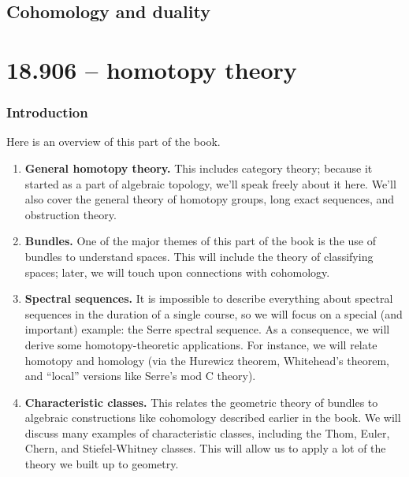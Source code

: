 \documentclass[11pt]{memoir}
\begin{document}
\chapter{Cohomology and duality}














\part{18.906 -- homotopy theory}\label{906}

\section*{Introduction}
Here is an overview of this part of the book.
\begin{enumerate}
    \item \textbf{General homotopy theory.} This includes category theory;
	because it started as a part of algebraic topology, we'll speak freely
	about it here.  We'll also cover the general theory of homotopy groups,
	long exact sequences, and obstruction theory.
    \item \textbf{Bundles.} One of the major themes of this part of the book is
	the use of bundles to understand spaces.  This will include the theory
	of classifying spaces; later, we will touch upon connections with
	cohomology.
    \item \textbf{Spectral sequences.} It is impossible to describe everything
	about spectral sequences in the duration of a single course, so we will
	focus on a special (and important) example: the Serre spectral
	sequence.  As a consequence, we will derive some homotopy-theoretic
	applications.  For instance, we will relate homotopy and homology (via
	the Hurewicz theorem, Whitehead's theorem, and ``local'' versions like
	Serre's mod C theory).
    \item \textbf{Characteristic classes.} This relates the geometric theory of
	bundles to algebraic constructions like cohomology described earlier in
	the book.  We will discuss many examples of characteristic classes,
	including the Thom, Euler, Chern, and Stiefel-Whitney classes.  This
	will allow us to apply a lot of the theory we built up to geometry.
\end{enumerate}
\end{document}
